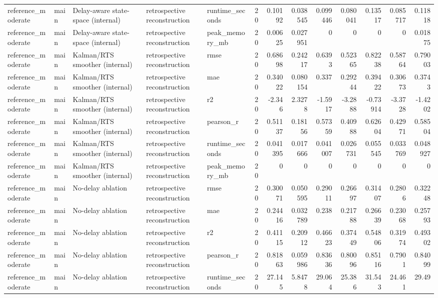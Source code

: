 \begin{table}[!htbp]
{{\begin{tabular}{lllllrrrrrrrr}
reference_moderate & main & Delay-aware state-space (internal) & retrospective reconstruction & runtime_seconds & 20 & 0.10192 & 0.038545 & 0.099446 & 0.080041 & 0.13517 & 0.085717 & 0.11818 \\
reference_moderate & main & Delay-aware state-space (internal) & retrospective reconstruction & peak_memory_mb & 20 & 0.00625 & 0.027951 & 0 & 0 & 0 & 0 & 0.01875 \\
reference_moderate & main & Kalman/RTS smoother (internal) & retrospective reconstruction & rmse & 20 & 0.68698 & 0.24217 & 0.6393 & 0.52365 & 0.82238 & 0.58764 & 0.79003 \\
reference_moderate & main & Kalman/RTS smoother (internal) & retrospective reconstruction & mae & 20 & 0.34022 & 0.080154 & 0.337 & 0.29244 & 0.39422 & 0.30673 & 0.3743 \\
reference_moderate & main & Kalman/RTS smoother (internal) & retrospective reconstruction & r2 & 20 & -2.346 & 2.3278 & -1.5917 & -3.2888 & -0.73914 & -3.3728 & -1.4202 \\
reference_moderate & main & Kalman/RTS smoother (internal) & retrospective reconstruction & pearson_r & 20 & 0.51137 & 0.18156 & 0.57359 & 0.40988 & 0.62604 & 0.42971 & 0.58504 \\
reference_moderate & main & Kalman/RTS smoother (internal) & retrospective reconstruction & runtime_seconds & 20 & 0.041395 & 0.017666 & 0.041007 & 0.026731 & 0.055545 & 0.033769 & 0.048927 \\
reference_moderate & main & Kalman/RTS smoother (internal) & retrospective reconstruction & peak_memory_mb & 20 & 0 & 0 & 0 & 0 & 0 & 0 & 0 \\
reference_moderate & main & No-delay ablation & retrospective reconstruction & rmse & 20 & 0.30071 & 0.050595 & 0.29011 & 0.26697 & 0.31407 & 0.2806 & 0.32248 \\
reference_moderate & main & No-delay ablation & retrospective reconstruction & mae & 20 & 0.24416 & 0.032789 & 0.238 & 0.21788 & 0.26639 & 0.23068 & 0.25793 \\
reference_moderate & main & No-delay ablation & retrospective reconstruction & r2 & 20 & 0.41115 & 0.20912 & 0.46623 & 0.37449 & 0.54806 & 0.31974 & 0.49302 \\
reference_moderate & main & No-delay ablation & retrospective reconstruction & pearson_r & 20 & 0.81863 & 0.059986 & 0.83636 & 0.80096 & 0.85116 & 0.7901 & 0.84099 \\
reference_moderate & main & No-delay ablation & retrospective reconstruction & runtime_seconds & 20 & 27.145 & 5.8478 & 29.064 & 25.386 & 31.543 & 24.461 & 29.49 \\

\end{tabular}}}
\end{table}
